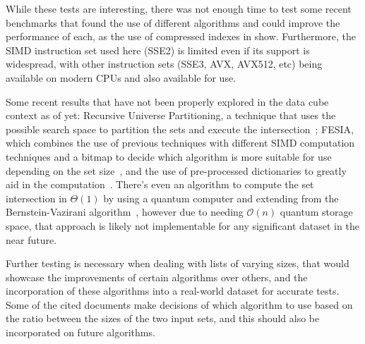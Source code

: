 While these tests are interesting, there was not enough time to test some recent benchmarks that found the use of different algorithms and could improve the performance of each, as the use of compressed indexes in  show.
Furthermore, the SIMD instruction set used here (SSE2) is limited even if its support is widespread, with other instruction sets (SSE3, AVX, AVX512, etc) being available on modern CPUs and also available for use.

Some recent results that have not been properly explored in the data cube context as of yet: Recursive Universe Partitioning, a technique that uses the possible search space to partition the sets and execute the intersection~\cite{pibiriFastCompactSet2021}; FESIA, which combines the use of previous techniques with different SIMD computation techniques and a bitmap to decide which algorithm is more suitable for use depending on the set size~\cite{zhangFESIAFastSIMDEfficient2020}, and the use of pre-processed dictionaries to greatly aid in the computation~\cite{dingFastSetIntersection2011}.
There's even an algorithm to compute the set intersection in $\Theta(1)$ by using a quantum computer and extending from the Bernstein-Vazirani algorithm~\cite{tianQuantumAlgorithmFinding2019}, however due to needing $\mathcal{O}(n)$ quantum storage space, that approach is likely not implementable for any significant dataset in the near future.

Further testing is necessary when dealing with lists of varying sizes, that would showcase the improvements of certain algorithms over others, and the incorporation of these algorithms into a real-world dataset for accurate tests.
Some of the cited documents make decisions of which algorithm to use based on the ratio between the sizes of the two input sets, and this should also be incorporated on future algorithms.

